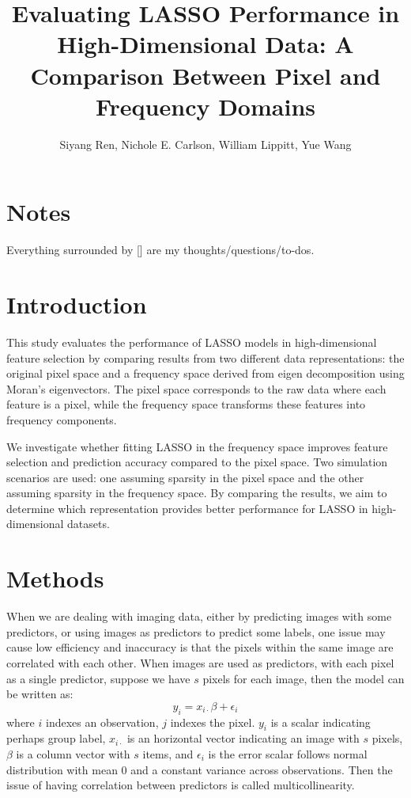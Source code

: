 \documentclass[12pt]{article}
\begin{document}
\title{Evaluating LASSO Performance in High-Dimensional Data: A Comparison Between Pixel and Frequency Domains}
\author{Siyang Ren, Nichole E. Carlson, William Lippitt, Yue Wang}
\date{}
\maketitle


\section*{Notes}

Everything surrounded by [] are my thoughts/questions/to-dos.


\section*{Introduction}

This study evaluates the performance of LASSO models in high-dimensional feature selection by comparing results from two different data representations: the original pixel space and a frequency space derived from eigen decomposition using Moran’s eigenvectors. The pixel space corresponds to the raw data where each feature is a pixel, while the frequency space transforms these features into frequency components.

We investigate whether fitting LASSO in the frequency space improves feature selection and prediction accuracy compared to the pixel space. Two simulation scenarios are used: one assuming sparsity in the pixel space and the other assuming sparsity in the frequency space. By comparing the results, we aim to determine which representation provides better performance for LASSO in high-dimensional datasets.


\section*{Methods}

When we are dealing with imaging data, either by predicting images with some predictors, or using images as predictors to predict some labels, one issue may cause low efficiency and inaccuracy is that the pixels within the same image are correlated with each other. When images are used as predictors, with each pixel as a single predictor, suppose we have \( s \) pixels for each image, then the model can be written as:
\[
  y_i = x_{i \cdot} \beta + \epsilon_i
\]
where \( i \) indexes an observation, \( j \) indexes the pixel. \( y_i \) is a scalar indicating perhaps group label, \( x_{i \cdot} \) is an horizontal vector indicating an image with \( s \) pixels, \( \beta \) is a column vector with \( s \) items, and \( \epsilon_i \) is the error scalar follows normal distribution with mean 0 and a constant variance across observations. Then the issue of having correlation between predictors is called multicollinearity.
\end{document}
